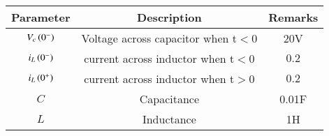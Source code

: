 \setlength{\arrayrulewidth}{0.3mm}
\setlength{\tabcolsep}{20pt}
\renewcommand{\arraystretch}{1.3}



\begin{tabular}{|c|c|c|}
\hline

Parameter& Description & Remarks\\
\hline
$V_c\left(0^{-}\right)$ & Voltage across capacitor when t$<$0 & 20V\\
\hline
$i_L \left(0^-\right)$ & current across inductor when t$<$0 & $0.2 $  \\
\hline
$i_L \left(0^+\right)$ & current across inductor when t$>$0 & $0.2 $\\
\hline
$C$ & Capacitance & 0.01F\\
\hline
$L$ & Inductance & 1H\\
\hline

\end{tabular}

